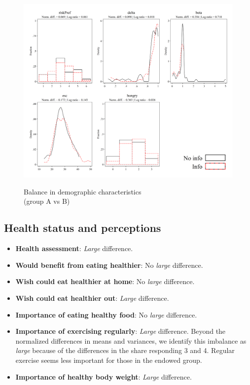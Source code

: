 \documentclass[12pt]{article}
\begin{document}
\begin{figure}[ht]
  \caption{Balance in demographic characteristics \\ (group A vs B)}\label{fig:group3_attitudes}
  \begin{center}
  {\includegraphics[width=1\textwidth]{./figures/covDifTreat_1_attitudes.png}}
  \end{center}
\end{figure}

\FloatBarrier

\clearpage

\subsection{Health status and perceptions}

\begin{itemize}
  \item \textbf{Health assessment}: \emph{Large} difference.

  \item \textbf{Would benefit from eating healthier}: No \emph{large} difference.

  \item \textbf{Wish could eat healthier at home}: No \emph{large} difference.

  \item \textbf{Wish could eat healthier out}: \emph{Large} difference.

  \item \textbf{Importance of eating healthy food}: No \emph{large} difference.

  \item \textbf{Importance of exercising regularly}: \emph{Large} difference.
  Beyond the normalized differences in means and variances, we identify this imbalance as \emph{large} because of the differences in the share responding 3 and 4. Regular exercise seems less important for those in the endowed group.

  \item \textbf{Importance of healthy body weight}: \emph{Large} difference.
\end{itemize}
\end{document}
